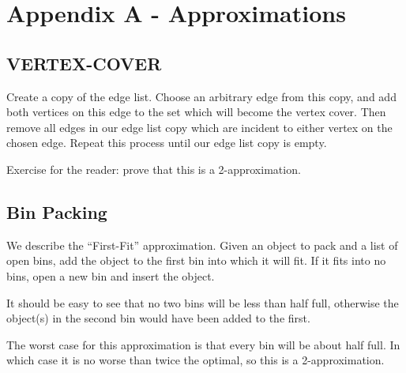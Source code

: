 \chapter{Appendix A - Approximations}

\section{VERTEX-COVER}

Create a copy of the edge list.  Choose an arbitrary edge from this
copy, and add both vertices on this edge to the set which will become
the vertex cover.  Then remove all edges in our edge list copy which
are incident to either vertex on the chosen edge.  Repeat this process
until our edge list copy is empty.

Exercise for the reader: prove that this is a 2-approximation.

\section{Bin Packing}

We describe the ``First-Fit'' approximation.  Given an object to pack
and a list of open bins, add the object to the first bin into which it
will fit.  If it fits into no bins, open a new bin and insert the object.

It should be easy to see that no two bins will be less than half full,
otherwise the object(s) in the second bin would have been added to the
first.

The worst case for this approximation is that every bin will be about
half full.  In which case it is no worse than twice the optimal, so
this is a 2-approximation.
